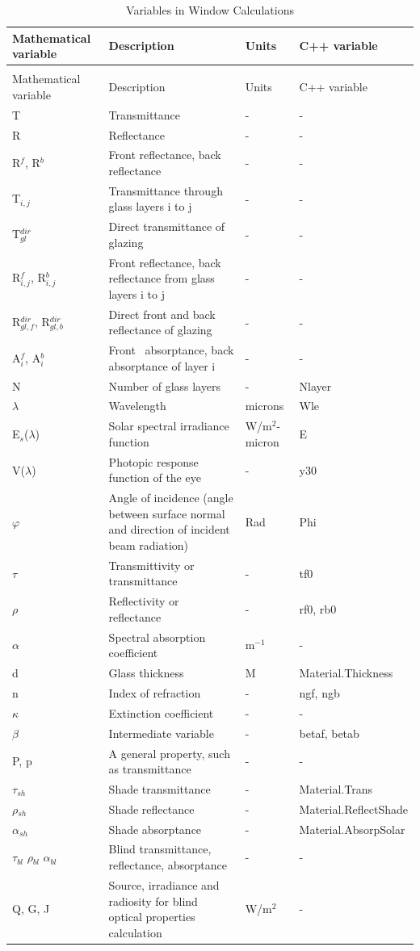 \begin{longtable}[c]{p{1.0in}p{2.5in}p{1.0in}p{1.5in}}
\caption{Variables in Window Calculations \label{table:variables-in-window-calculations}} \tabularnewline
\toprule
Mathematical variable & Description & Units & C++ variable \tabularnewline
\midrule
\endfirsthead

\caption[]{Variables in Window Calculations} \tabularnewline
\toprule
Mathematical variable & Description & Units & C++ variable \tabularnewline
\midrule
\endhead

T & Transmittance & - & - \tabularnewline
R & Reflectance & - & - \tabularnewline
R\(^{f}\), R\(^{b}\) & Front reflectance, back reflectance & - & - \tabularnewline
T\(_{i,j}\) & Transmittance through glass layers i to j & - & - \tabularnewline
T\(^{dir}_{gl}\) & Direct transmittance of glazing & - & - \tabularnewline
R\(^{f}_{i,j}\), R\(^{b}_{i,j}\) & Front reflectance, back reflectance from glass layers i to j & - & - \tabularnewline
R\(^{dir}_{gl,f}\), R\(^{dir}_{gl,b}\) & Direct front and back reflectance of glazing & - & - \tabularnewline
A\(^{f}_{i}\), A\(^{b}_{i}\) & Front~ absorptance, back absorptance of layer i & - & - \tabularnewline
N & Number of glass layers & - & Nlayer \tabularnewline
$\lambda$ & Wavelength & microns & Wle \tabularnewline
E\(_{s}\)($\lambda$) & Solar spectral irradiance function & W/m\(^{2}\)-micron & E \tabularnewline
V($\lambda$) & Photopic response function of the eye & - & y30 \tabularnewline
$\varphi$ & Angle of incidence (angle between surface normal and direction of incident beam radiation) & Rad & Phi \tabularnewline
$\tau$ & Transmittivity or transmittance & - & tf0 \tabularnewline
$\rho$ & Reflectivity or reflectance & - & rf0, rb0 \tabularnewline
$\alpha$ & Spectral absorption coefficient & m\(^{-1}\) & - \tabularnewline
d & Glass thickness & M & Material.Thickness \tabularnewline
n & Index of refraction & - & ngf, ngb \tabularnewline
$\kappa$ & Extinction coefficient & - & - \tabularnewline
$\beta$ & Intermediate variable & - & betaf, betab \tabularnewline
P, p & A general property, such as transmittance & - & - \tabularnewline
$\tau$\(_{sh}\) & Shade transmittance & - & Material.Trans \tabularnewline
$\rho$\(_{sh}\) & Shade reflectance & - & Material.ReflectShade \tabularnewline
$\alpha$\(_{sh}\) & Shade absorptance & - & Material.AbsorpSolar \tabularnewline
$\tau$\(_{bl}\) $\rho$\(_{bl}\) $\alpha$\(_{bl}\) & Blind transmittance, reflectance, absorptance & - & - \tabularnewline
Q, G, J & Source, irradiance and radiosity for blind optical properties calculation & W/m\(^{2}\) & - \tabularnewline

\end{longtable}
